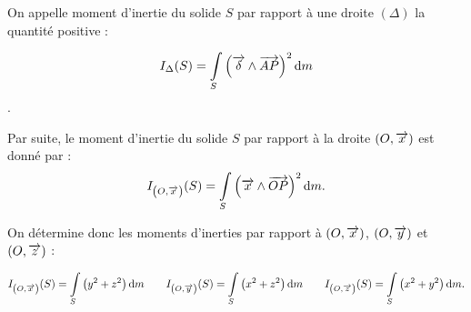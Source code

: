 \documentclass[10pt,fleqn]{article} %
\begin{document}
\begin{defi}
On appelle moment d'inertie du solide $S$ par rapport à une droite $\left(\Delta\right)$ la quantité positive :

$$ I_{\Delta}(S)=\int\limits_S \left( \overrightarrow{\delta} \wedge \overrightarrow{AP}\right)^2 \text{d} m  $$.

Par suite, le moment d'inertie du solide $S$ par rapport à la droite $\left(O,\overrightarrow{x}\right)$ est donné par : 
$$ I_{\left(O,\overrightarrow{x}\right)}(S)=\int\limits_S \left( \overrightarrow{x} \wedge \overrightarrow{OP}\right)^2 \text{d} m.  $$

On détermine donc les moments d'inerties par rapport à $\left(O,\overrightarrow{x}\right)$, $\left(O,\overrightarrow{y}\right)$ et $\left(O,\overrightarrow{z}\right)$ :

$$ I_{\left(O,\overrightarrow{x}\right)}(S) =\int\limits_S \left(y^2 + z^2\right) \text{d} m\quad \quad
I_{\left(O,\overrightarrow{y}\right)}(S)     =\int\limits_S \left(x^2 + z^2\right) \text{d} m\quad \quad
I_{\left(O,\overrightarrow{z}\right)}(S)     =\int\limits_S \left(x^2 + y^2\right)\text{d} m.
$$



\end{defi}

%


%
\end{document}

